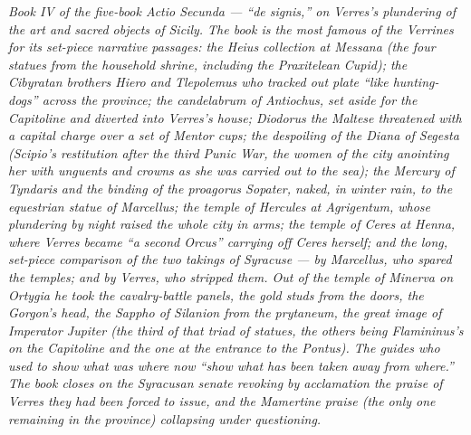 
\textit{Book IV of the five-book Actio Secunda --- ``de signis,'' on
Verres's plundering of the art and sacred objects of Sicily. The
book is the most famous of the Verrines for its set-piece
narrative passages: the Heius collection at Messana (the four
statues from the household shrine, including the Praxitelean
Cupid); the Cibyratan brothers Hiero and Tlepolemus who tracked
out plate ``like hunting-dogs'' across the province; the
candelabrum of Antiochus, set aside for the Capitoline and
diverted into Verres's house; Diodorus the Maltese threatened
with a capital charge over a set of Mentor cups; the despoiling
of the Diana of Segesta (Scipio's restitution after the third
Punic War, the women of the city anointing her with unguents and
crowns as she was carried out to the sea); the Mercury of
Tyndaris and the binding of the proagorus Sopater, naked, in
winter rain, to the equestrian statue of Marcellus; the temple
of Hercules at Agrigentum, whose plundering by night raised
the whole city in arms; the temple of Ceres at Henna, where
Verres became ``a second Orcus'' carrying off Ceres herself;
and the long, set-piece comparison of the two takings of
Syracuse --- by Marcellus, who spared the temples; and by
Verres, who stripped them. Out of the temple of Minerva on
Ortygia he took the cavalry-battle panels, the gold studs from
the doors, the Gorgon's head, the Sappho of Silanion from the
prytaneum, the great image of Imperator Jupiter (the third of
that triad of statues, the others being Flamininus's on the
Capitoline and the one at the entrance to the Pontus). The
guides who used to show what was where now ``show what has been
taken away from where.'' The book closes on the Syracusan senate
revoking by acclamation the praise of Verres they had been
forced to issue, and the Mamertine praise (the only one
remaining in the province) collapsing under questioning.}
